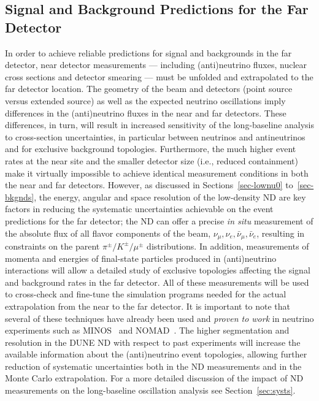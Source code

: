 \subsection{Signal and Background Predictions for the Far Detector} 
\label{sec-extfd} 
In order to achieve reliable predictions for signal and backgrounds in the far detector, near detector measurements --- including (anti)neutrino fluxes, nuclear cross sections and detector 
smearing --- must be unfolded and extrapolated to the far detector location. 
The geometry of the beam and detectors (point source versus extended source) 
as well as the expected neutrino oscillations imply differences in the (anti)neutrino fluxes 
 in the near and far detectors. 
These differences, in turn, will result in increased sensitivity of the long-baseline analysis to cross-section uncertainties, in particular between neutrinos and antineutrinos and for exclusive background topologies. 
Furthermore, the much higher event rates at the near site and the 
smaller detector size (i.e., reduced containment) make it virtually impossible to achieve identical measurement 
conditions in both the near and far detectors. However, as discussed in 
Sections~\ref{sec-lownu0} to~\ref{sec-bkgnds}, the energy, angular and 
space resolution of the low-density %
ND are key factors in reducing the systematic uncertainties achievable 
on the event predictions for the far detector; the ND can offer a precise \emph{in situ} 
measurement of the absolute flux of all flavor components of the beam, 
$\nu_\mu, \nu_e, \bar\nu_\mu, \bar \nu_e$, resulting in constraints on the parent 
$\pi^\pm/K^\pm/\mu^\pm$ distributions. 
%
In addition, measurements of momenta and energies of final-state particles produced 
in (anti)neutrino interactions will allow a detailed study of exclusive topologies affecting the 
signal and background rates in the far detector. 
All of these measurements will be used to cross-check and fine-tune the simulation programs  
needed for the actual extrapolation from the near to the far detector. 
It is important to note that several of these techniques have already been used and \emph{proven to work} 
in neutrino experiments such as MINOS~\cite{Adamson:2009ju} and 
NOMAD~\cite{Wu:2007ab,Lyubushkin:2008pe,Samoylov:2013xoa}. 
The higher segmentation and resolution in the DUNE ND with respect to past experiments 
will increase the available information about the (anti)neutrino event topologies, allowing further 
reduction of systematic uncertainties both in the ND measurements and in the Monte Carlo extrapolation.  
For a more detailed discussion of the impact of ND measurements on the long-baseline oscillation analysis see 
Section~\ref{sec:systs}.  
 
